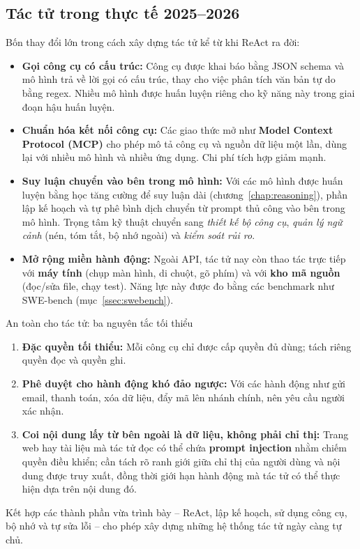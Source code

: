 \subsection{Tác tử trong thực tế 2025--2026}
\label{ssec:modern_agents}
Bốn thay đổi lớn trong cách xây dựng tác tử kể từ khi ReAct ra đời:
\begin{itemize}
	\item \textbf{Gọi công cụ có cấu trúc:} Công cụ được khai báo bằng JSON schema và mô hình trả về lời gọi có cấu trúc, thay cho việc phân tích văn bản tự do bằng regex. Nhiều mô hình được huấn luyện riêng cho kỹ năng này trong giai đoạn hậu huấn luyện.
	\item \textbf{Chuẩn hóa kết nối công cụ:} Các giao thức mở như \textbf{Model Context Protocol (MCP)} cho phép mô tả công cụ và nguồn dữ liệu một lần, dùng lại với nhiều mô hình và nhiều ứng dụng. Chi phí tích hợp giảm mạnh.
	\item \textbf{Suy luận chuyển vào bên trong mô hình:} Với các mô hình được huấn luyện bằng học tăng cường để suy luận dài (chương~\ref{chap:reasoning}), phần lập kế hoạch và tự phê bình dịch chuyển từ prompt thủ công vào bên trong mô hình. Trọng tâm kỹ thuật chuyển sang \emph{thiết kế bộ công cụ}, \emph{quản lý ngữ cảnh} (nén, tóm tắt, bộ nhớ ngoài) và \emph{kiểm soát rủi ro}.
	\item \textbf{Mở rộng miền hành động:} Ngoài API, tác tử nay còn thao tác trực tiếp với \textbf{máy tính} (chụp màn hình, di chuột, gõ phím) và với \textbf{kho mã nguồn} (đọc/sửa file, chạy test). Năng lực này được đo bằng các benchmark như SWE-bench (mục~\ref{ssec:swebench}).
\end{itemize}
\begin{pitfall}{An toàn cho tác tử: ba nguyên tắc tối thiểu}
\begin{enumerate}
	\item \textbf{Đặc quyền tối thiểu:} Mỗi công cụ chỉ được cấp quyền đủ dùng; tách riêng quyền đọc và quyền ghi.
	\item \textbf{Phê duyệt cho hành động khó đảo ngược:} Với các hành động như gửi email, thanh toán, xóa dữ liệu, đẩy mã lên nhánh chính, nên yêu cầu người xác nhận.
	\item \textbf{Coi nội dung lấy từ bên ngoài là dữ liệu, không phải chỉ thị:} Trang web hay tài liệu mà tác tử đọc có thể chứa \textbf{prompt injection} nhằm chiếm quyền điều khiển; cần tách rõ ranh giới giữa chỉ thị của người dùng và nội dung được truy xuất, đồng thời giới hạn hành động mà tác tử có thể thực hiện dựa trên nội dung đó.
\end{enumerate}
\end{pitfall}

Kết hợp các thành phần vừa trình bày -- ReAct, lập kế hoạch, sử dụng công cụ, bộ nhớ và tự sửa lỗi -- cho phép xây dựng những hệ thống tác tử ngày càng tự chủ.